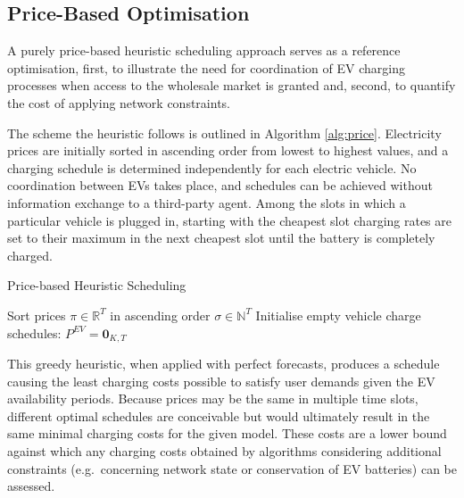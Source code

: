 \subsection{Price-Based Optimisation}
\label{sec:pbh}

A purely price-based heuristic scheduling approach serves as a reference optimisation, first, to illustrate the need for coordination of EV charging processes when access to the wholesale market is granted and, second, to quantify the cost of applying network constraints.

The scheme the heuristic follows is outlined in Algorithm \ref{alg:price}. Electricity prices are initially sorted in ascending order from lowest to highest values, and a charging schedule is determined independently for each electric vehicle. No coordination between EVs takes place, and schedules can be achieved without information exchange to a third-party agent. Among the slots in which a particular vehicle is plugged in, starting with the cheapest slot charging rates are set to their maximum in the next cheapest slot until the battery is completely charged.

\begin{algorithm} 
	\caption{Price-based Heuristic Scheduling}
	\begin{spacing}{1.2}
		\begin{algorithmic}[1]
			\State Sort prices $\pi\in\mathbb{R}^T$ in ascending order $\sigma \in \mathbb{N}^T$
			\State Initialise empty vehicle charge schedules: $P^{EV} = \bm{0}_{K,T}$
			\EndIf
			\EndWhile
			\EndFor
			\EndFor
			\State {}
		\end{algorithmic}
	\end{spacing}
	
	\label{alg:price}
\end{algorithm}

This greedy heuristic, when applied with perfect forecasts, produces a schedule causing the least charging costs possible to satisfy user demands given the EV availability periods. Because prices may be the same in multiple time slots, different optimal schedules are conceivable but would ultimately result in the same minimal charging costs for the given model. These costs are a lower bound against which any charging costs obtained by algorithms considering additional constraints (e.g.\ concerning network state or conservation of EV batteries) can be assessed.

